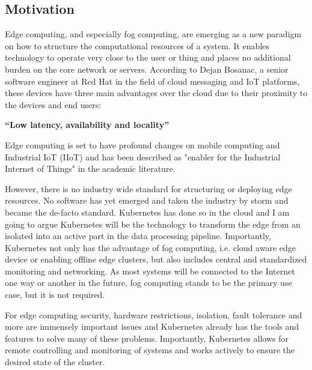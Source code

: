 \subsection{Motivation}
Edge computing, and especially fog computing, are emerging as a new paradigm on how to structure the computational resources of a system. It enables technology to operate very close to the user or thing and places no additional burden on the core network or servers. According to Dejan Bosanac, a senior software engineer at Red Hat in the field of cloud messaging and IoT platforms, these devices have three main advantages over the cloud due to their proximity to the devices and end users: 
\begin{displayquote}
{\textbf{``Low latency, availability and locality''}}\cite{IntroducingDejanBosanac:KubernetesIoTEdgeWorkingGroup}
\end{displayquote} 
Edge computing is set to have profound changes on mobile computing and Industrial IoT (IIoT) and has been described as "enabler for the Industrial Internet of Things"\cite{steiner2016fogenablerIIoT} in the academic literature.

However, there is no industry wide standard for structuring or deploying edge resources. No software has yet emerged and taken the industry by storm and became the de-facto standard. Kubernetes has done so in the cloud and I am going to argue Kubernetes will be the technology to transform the edge from an isolated into an active part in the data processing pipeline. Importantly, Kubernetes not only has the advantage of fog computing, i.e. cloud aware edge device or enabling offline edge clusters, but also includes central and standardized monitoring and networking. As most systems will be connected to the Internet one way or another in the future, fog computing stands to be the primary use case, but it is not required.

For edge computing security, hardware restrictions, isolation, fault tolerance and more are immensely important issues and Kubernetes already has the tools and features to solve many of these problems. Importantly, Kubernetes allows for remote controlling and monitoring of systems and works actively to ensure the desired state of the cluster.

